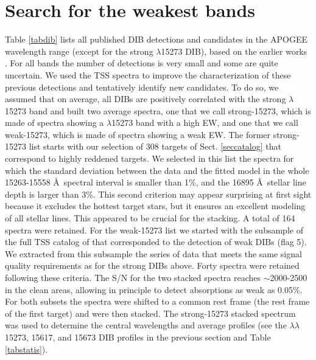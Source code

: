 \documentclass[printer]{aa} %
\begin{document}
\section{Search for the weakest bands\label{secsearch}}
Table \ref{tabdib} lists all published DIB detections and candidates in the APOGEE wavelength range (except for the strong $\lambda$15273 DIB), based on the earlier works \citep{Geballe11, Cox14}. For all bands the number of detections is very small and some are quite uncertain. We used the TSS spectra to improve the characterization of these previous detections and tentatively identify new candidates. To do so, we assumed that on average, all DIBs are positively correlated with the strong $\lambda$15273 band and built two average spectra, one that we call strong-15273, which is made of spectra showing a $\lambda$15273 band with a high EW, and one that we call weak-15273, which is made of spectra showing a weak EW. The former strong-15273 list starts with our selection of 308 targets of Sect. \ref{seccatalog} that correspond to highly reddened targets. We selected in this list the spectra for which the standard deviation between the data and the fitted model in the whole 15263-15558 \AA\ spectral interval is smaller than 1\%,  and the 16895 \AA\ stellar line depth is larger than 3\%. This second criterion may appear surprising at first sight because it excludes the hottest target stars, but it ensures an excellent modeling of all stellar lines. This appeared to be crucial for the stacking. A total of 164 spectra were retained. 
For the weak-15273 list we started with the subsample of the full TSS catalog of \cite{Elyajouri16} that corresponded to the detection of weak DIBs (flag 5). We extracted from this subsample  the series of data that meets the same signal quality requirements as for the strong DIBs above. Forty spectra were retained following these criteria. The S/N for the two stacked spectra reaches $\sim$2000-2500 in the clean areas, allowing in principle to detect absorptions as weak as 0.05\%. For both subsets the spectra were shifted to a common rest frame (the rest frame of the first target) and were then stacked. The strong-15273 stacked spectrum was used to determine the central wavelengths and average profiles (see the $\lambda\lambda$15273, 15617, and 15673 DIB profiles in the previous section and Table \ref{tabstatis}). 
\end{document}
